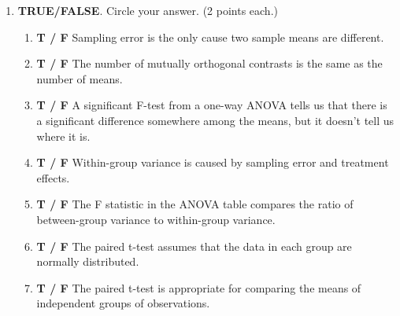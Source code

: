 \documentclass[12pt]{article}
\begin{document}
\begin{enumerate}
\begin{enumerate}
\item (10) \parbox[t]{6in}{Perform Tukey's procedure to perform every pairwise comparison.$\alpha=0.05$. Give a conclusion.} 
\end{enumerate}
\newpage
\item \textbf{TRUE/FALSE}. Circle your answer. (2 points each.)
\begin{enumerate}
\item \textbf{T / F} Sampling error is the only cause two sample means are different.
\item \textbf{T / F} The number of mutually orthogonal contrasts is the same as the number of means.
\item \textbf{T / F} A significant F-test from a one-way ANOVA tells us that there is a significant difference somewhere among the means, but it doesn't tell us where it is.
\item \textbf{T / F} Within-group variance is caused by sampling error and treatment effects.
\item \textbf{T / F} The F statistic in the ANOVA table compares the ratio of between-group variance to within-group variance.
\item \textbf{T / F} The paired t-test assumes that the data in each group are normally distributed.
\item \textbf{T / F} The paired t-test is appropriate for comparing the means of independent groups of observations.
\end{enumerate}
\end{enumerate}
\end{document}
